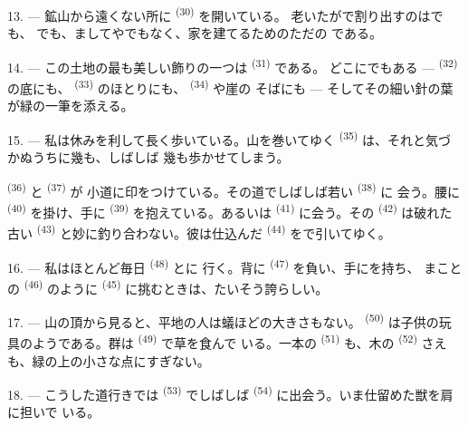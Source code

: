 13. --- 鉱山から遠くない所に \textsuperscript{(30)} を開いている。
老いたがで割り出すのはでも、
でも、ましてやでもなく、家を建てるためのただの
である。

14. --- この土地の最も美しい飾りの一つは \textsuperscript{(31)} である。
どこにでもある ---  \textsuperscript{(32)} の底にも、
\textsuperscript{(33)} のほとりにも、 \textsuperscript{(34)} や崖の
そばにも --- そしてその細い針の葉が緑の一筆を添える。

\VUsaut{3.0mm}
\VUsaut{3.0mm}

15. --- 私は休みを利して長く歩いている。山を巻いてゆく
\textsuperscript{(35)} は、それと気づかぬうちに幾も、しばしば
幾も歩かせてしまう。

 \textsuperscript{(36)} と \textsuperscript{(37)} が
小道に印をつけている。その道でしばしば若い \textsuperscript{(38)} に
会う。腰に \textsuperscript{(40)} を掛け、手に
\textsuperscript{(39)} を抱えている。あるいは \textsuperscript{(41)}
に会う。その \textsuperscript{(42)} は破れた古い
\textsuperscript{(43)} と妙に釣り合わない。彼は仕込んだ
\textsuperscript{(44)} をで引いてゆく。

\VUsaut{3.0mm}

16. --- 私はほとんど毎日 \textsuperscript{(48)} とに
行く。背に \textsuperscript{(47)} を負い、手にを持ち、
まことの \textsuperscript{(46)} のように \textsuperscript{(45)}
に挑むときは、たいそう誇らしい。

17. --- 山の頂から見ると、平地の人は蟻ほどの大きさもない。 \textsuperscript{(50)}
は子供の玩具のようである。群は \textsuperscript{(49)} で草を食んで
いる。一本の \textsuperscript{(51)} も、木の
\textsuperscript{(52)} さえも、緑の上の小さな点にすぎない。

18. --- こうした道行きでは \textsuperscript{(53)} でしばしば
 \textsuperscript{(54)} に出会う。いま仕留めた獣を肩に担いで
いる。

